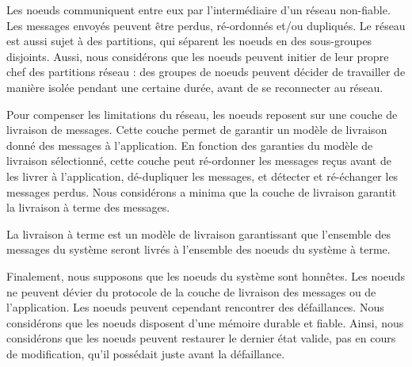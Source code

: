 Les noeuds communiquent entre eux par l'intermédiaire d'un réseau non-fiable.
Les messages envoyés peuvent être perdus, ré-ordonnés et/ou dupliqués.
Le réseau est aussi sujet à des partitions, qui séparent les noeuds en des sous-groupes disjoints.
Aussi, nous considérons que les noeuds peuvent initier de leur propre chef des partitions réseau : des groupes de noeuds peuvent décider de travailler de manière isolée pendant une certaine durée, avant de se reconnecter au réseau.

Pour compenser les limitations du réseau, les noeuds reposent sur une couche de livraison de messages.
Cette couche permet de garantir un modèle de livraison donné des messages à l'application.
En fonction des garanties du modèle de livraison sélectionné, cette couche peut ré-ordonner les messages reçus avant de les livrer à l'application, dé-dupliquer les messages, et détecter et ré-échanger les messages perdus.
Nous considérons a minima que la couche de livraison garantit la livraison à terme des messages.

\begin{definition}
    La livraison à terme est un modèle de livraison garantissant que l'ensemble des messages du système seront livrés à l'ensemble des noeuds du système à terme.
\end{definition}

Finalement, nous supposons que les noeuds du système sont honnêtes.
Les noeuds ne peuvent dévier du protocole de la couche de livraison des messages ou de l'application.
Les noeuds peuvent cependant rencontrer des défaillances.
Nous considérons que les noeuds disposent d'une mémoire durable et fiable.
Ainsi, nous considérons que les noeuds peuvent restaurer le dernier état valide, \ie pas en cours de modification, qu'il possédait juste avant la défaillance.
